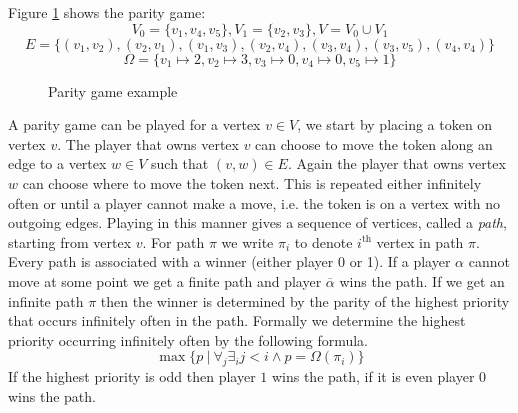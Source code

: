\begin{example}
	Figure \ref{fig:simplepgpg} shows the parity game:
	\[ V_0 = \{v_1,v_4,v_5\},V_1 = \{v_2,v_3\}, V = V_0 \cup V_1\]
	\[ E = \{(v_1,v_2),(v_2,v_1),(v_1,v_3),(v_2,v_4),(v_3,v_4),(v_3,v_5),(v_4,v_4)\}\] 
	\[ \Omega = \{v_1 \mapsto 2, v_2 \mapsto 3, v_3 \mapsto 0, v_4 \mapsto 0, v_5 \mapsto 1 \}\]
	\begin{figure}[h]
		\centering
		\caption[Parity game example]{Parity game example}
		\label{fig:simplepgpg}
	\end{figure}
\end{example}

A parity game can be played for a vertex $v \in V$, we start by placing a token on vertex $v$. The player that owns vertex $v$ can choose to move the token along an edge to a vertex $w \in V$ such that $(v,w) \in E$. Again the player that owns vertex $w$ can choose where to move the token next. This is repeated either infinitely often or until a player cannot make a move, i.e. the token is on a vertex with no outgoing edges. Playing in this manner gives a sequence of vertices, called a \textit{path}, starting from vertex $v$. For path $\pi$ we write $\pi_i$ to denote $i^\text{th}$ vertex in path $\pi$. Every path is associated with a winner (either player 0 or 1). If a player $\alpha$ cannot move at some point we get a finite path and player $\overline{\alpha}$ wins the path. If we get an infinite path $\pi$ then the winner is determined by the parity of the highest priority that occurs infinitely often in the path. Formally we determine the highest priority occurring infinitely often by the following formula.
\[ \max\{ p \ |\ \forall_j \exists_i j < i \wedge p = \Omega(\pi_i) \}\] 
If the highest priority is odd then player $1$ wins the path, if it is even player $0$ wins the path.


